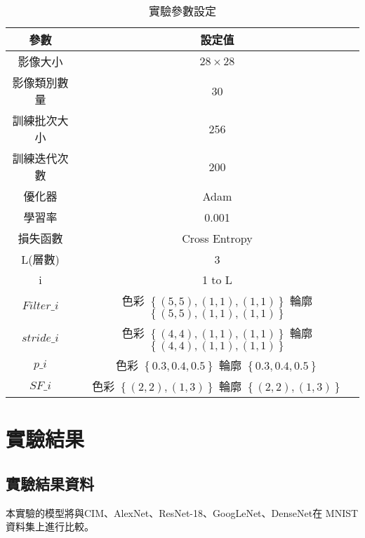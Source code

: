 \documentclass[class=NCU\_thesis, crop=false]{standalone}
\begin{document}
    \begin{table}[H]
        \centering
        \caption{實驗參數設定}
        \label{tab:ColoredModelparameters}
        \begin{tabular}{| c | c |}
            \hline
            參數 & 設定值 \\
            \hline
            \hline
            影像大小 & $28\times28$ \\
            \hline
            影像類別數量 & 30 \\
            \hline
            訓練批次大小 & 256 \\
            \hline
            訓練迭代次數 & 200 \\
            \hline
            優化器 & Adam \\
            \hline
            學習率 & 0.001 \\
            \hline
            損失函數 & Cross Entropy \\
            \hline
            L(層數) & 3 \\
            \hline
            i & 1 to L \\
            \hline
            $Filter\_{i}$ & \makecell{色彩 $\left\{(5, 5), (1, 1), (1, 1)\right\}$ \\ 輪廓 $\left\{(5, 5), (1, 1), (1, 1)\right\}$ }\\
            \hline 
            $stride\_{i}$ & \makecell{色彩 $\left\{(4, 4), (1, 1), (1, 1)\right\}$ \\ 輪廓 $\left\{(4, 4), (1, 1), (1, 1)\right\}$ } \\
            \hline
            $p\_{i}$ & \makecell{色彩 $\left\{0.3, 0.4, 0.5\right\}$  \\ 輪廓 $\left\{0.3, 0.4, 0.5\right\}$ } \\
            \hline
            $SF\_{i}$ &  \makecell{色彩 $\left\{(2, 2), (1, 3)\right\}$ \\ 輪廓 $\left\{(2, 2), (1, 3)\right\}$ }  \\
            \hline 
        \end{tabular}
    \end{table}

\section{實驗結果}
    \subsection{實驗結果資料}
    本實驗的模型將與CIM、AlexNet\cite{NIPS2012_c399862d}、ResNet-18\cite{He_2016_CVPR}、GoogLeNet\cite{Szegedy_2015_CVPR}、DenseNet\cite{Huang_2017_CVPR}在 MNIST 資料集上進行比較。
\end{document}
